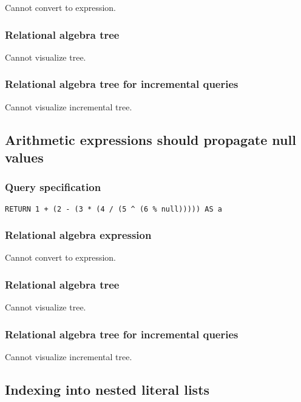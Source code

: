 Cannot convert to expression.

\subsubsection*{Relational algebra tree}

Cannot visualize tree.

\subsubsection*{Relational algebra tree for incremental queries}

Cannot visualize incremental tree.

\subsection{Arithmetic expressions should propagate null values}

\subsubsection*{Query specification}

\begin{lstlisting}
RETURN 1 + (2 - (3 * (4 / (5 ^ (6 % null))))) AS a
\end{lstlisting}

\subsubsection*{Relational algebra expression}

Cannot convert to expression.

\subsubsection*{Relational algebra tree}

Cannot visualize tree.

\subsubsection*{Relational algebra tree for incremental queries}

Cannot visualize incremental tree.

\subsection{Indexing into nested literal lists}

